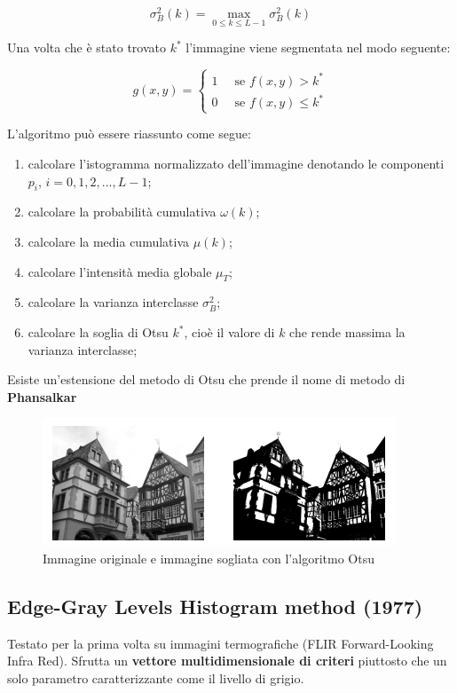 $$
    \sigma^2_B(k) = \max_{0\le k \le L-1} \sigma^2_B(k)
$$

Una volta che è stato trovato $k^*$ l'immagine viene segmentata nel modo seguente:

$$
    g(x,y) = \begin{cases} 1 & \ \text{ se } f(x,y) > k^*   \\
              0 & \ \text{ se } f(x,y) \le k^*
    \end{cases}
$$

L'algoritmo può essere riassunto come segue:

\begin{enumerate}
    \item calcolare l'istogramma normalizzato dell'immagine denotando le componenti $p_i$, $i=0,1,2,...,L-1$;
    \item calcolare la probabilità cumulativa $\omega(k)$;
    \item calcolare la media cumulativa $\mu(k)$;
    \item calcolare l'intensità media globale $\mu_T$;
    \item calcolare la varianza interclasse $\sigma^2_B$;
    \item  calcolare la soglia di Otsu $k^*$, cioè il valore di $k$ che rende massima la varianza interclasse;
\end{enumerate}

Esiste un'estensione del metodo di Otsu che prende il nome di metodo di \textbf{Phansalkar}


\begin{figure}[H]
    \centering
    \includegraphics[width=\linewidth, keepaspectratio]{capitoli/immagini/imgs/otsu.png}
    \caption{Immagine originale e immagine sogliata con l'algoritmo Otsu}
\end{figure}

\subsection{Edge-Gray Levels Histogram method (1977)}
Testato per la prima volta su immagini
termografiche (FLIR Forward-Looking Infra Red). Sfrutta un \textbf{vettore
    multidimensionale di criteri} piuttosto che un solo parametro
caratterizzante come il livello di grigio.

